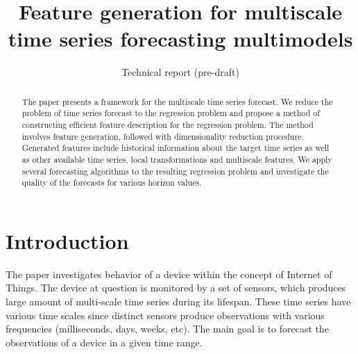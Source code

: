 \documentclass[conference]{IEEEtran}
\begin{document}
\title{Feature generation for multiscale time series forecasting multimodels}



\date{Technical report (pre-draft)}
\maketitle

\begin{abstract}
The paper presents a framework for the multiscale time series forecast. We reduce the problem of time series forecast to the regression problem and propose a method of constructing efficient feature description for the regression problem.
The method involves feature generation, followed with dimensionality reduction procedure. Generated features include historical information about the target time series as well as other available time series, local transformations and  multiscale features. We apply several forecasting algorithms to the resulting regression problem and investigate the quality of the forecasts for various horizon values.
\end{abstract}



\section{Introduction}
The paper investigates behavior of a device within the concept of Internet of Things. The device at question is monitored by a set of sensors, which produces large amount of multi-scale time series during its lifespan. These time series have various time scales since distinct sensors produce observations with various frequencies (milliseconds, days, weeks, etc).  The main goal is to forecast the observations of a device in a given time range.
\end{document}
